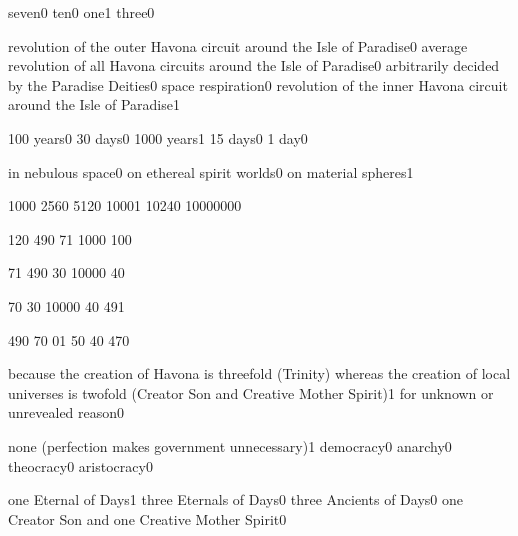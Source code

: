 {seven}{0}
{ten}{0}
{one}{1}
{three}{0}
\qstop

{revolution of the outer Havona circuit around the Isle of Paradise}{0}
{average revolution of all Havona circuits around the Isle of Paradise}{0}
{arbitrarily decided by the Paradise Deities}{0}
{space respiration}{0}
{revolution of the inner Havona circuit around the Isle of Paradise}{1}
\qstop


{100 years}{0}
{30 days}{0}
{1000 years}{1}
{15 days}{0}
{1 day}{0}
\qstop

{in nebulous space}{0}
{on ethereal spirit worlds}{0}
{on material spheres}{1}
\qstop

{100}{0}
{256}{0}
{512}{0}
{1000}{1}
{1024}{0}
{1000000}{0}
\qstop

{12}{0}
{49}{0}
{7}{1}
{100}{0}
{10}{0}
\qstop

{7}{1}
{49}{0}
{3}{0}
{1000}{0}
{4}{0}
\qstop

{7}{0}
{3}{0}
{1000}{0}
{4}{0}
{49}{1}
\qstop

{49}{0}
{7}{0}
{0}{1}
{5}{0}
{4}{0}
{47}{0}
\qstop

{because the creation of Havona is threefold (Trinity) whereas the creation of local universes is twofold (Creator Son and Creative Mother Spirit)}{1}
{for unknown or unrevealed reason}{0}
\qstop

{none (perfection makes government unnecessary)}{1}
{democracy}{0}
{anarchy}{0}
{theocracy}{0}
{aristocracy}{0}
\qstop

{one Eternal of Days}{1}
{three Eternals of Days}{0}
{three Ancients of Days}{0}
{one Creator Son and one Creative Mother Spirit}{0}
\qstop

